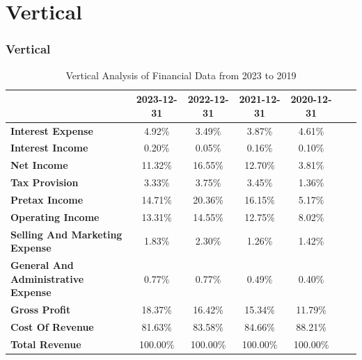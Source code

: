 \documentclass{beamer}%
\begin{document}
%
\section{Vertical}%
\label{sec:Vertical}%
\begin{frame}%
\frametitle{Vertical}%

    \begin{table}[ht]
    \centering
    \tiny
    \begin{tabular}{lcccccc}
    \toprule
     & \textbf{2023-12-31} & \textbf{2022-12-31} & \textbf{2021-12-31} & \textbf{2020-12-31} \\
    \midrule
    \textbf{Interest Expense} & 4.92\% & 3.49\% & 3.87\% & 4.61\% \\
\textbf{Interest Income} & 0.20\% & 0.05\% & 0.16\% & 0.10\% \\
\textbf{Net Income} & 11.32\% & 16.55\% & 12.70\% & 3.81\% \\
\textbf{Tax Provision} & 3.33\% & 3.75\% & 3.45\% & 1.36\% \\
\textbf{Pretax Income} & 14.71\% & 20.36\% & 16.15\% & 5.17\% \\
\textbf{Operating Income} & 13.31\% & 14.55\% & 12.75\% & 8.02\% \\
\textbf{Selling And Marketing Expense} & 1.83\% & 2.30\% & 1.26\% & 1.42\% \\
\textbf{General And Administrative Expense} & 0.77\% & 0.77\% & 0.49\% & 0.40\% \\
\textbf{Gross Profit} & 18.37\% & 16.42\% & 15.34\% & 11.79\% \\
\textbf{Cost Of Revenue} & 81.63\% & 83.58\% & 84.66\% & 88.21\% \\
\textbf{Total Revenue} & 100.00\% & 100.00\% & 100.00\% & 100.00\% \\

    \bottomrule
    \end{tabular}
    \caption{Vertical Analysis of Financial Data from 2023 to 2019}
    \label{tab:vertical_data}
    \end{table}
\end{frame}

%
\end{document}
